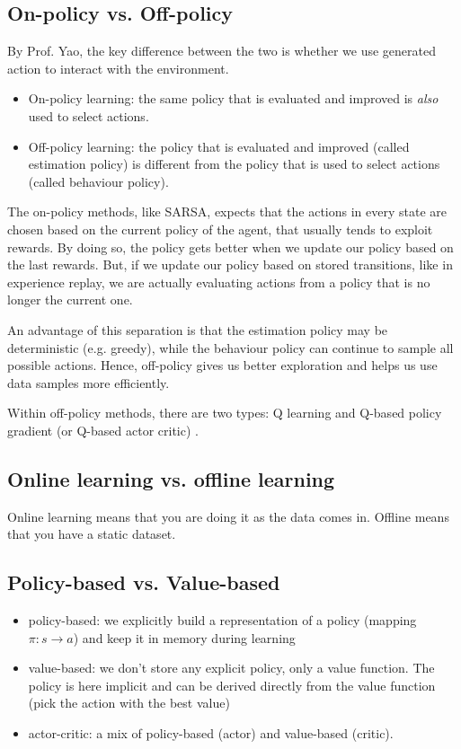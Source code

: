 \documentclass[lang=en,mode=normal,device=normal,color=blue,12pt]{elegantnote}
\DeclareMathOperator*{\1}{\mathbbm{1}}
\begin{document}
\subsection{On-policy vs. Off-policy}
\label{appendix:on-off-policy}

By Prof. Yao, the key difference between the two is whether we use generated action to interact with the environment.

\begin{itemize}
\item On-policy learning: the same policy that is evaluated and improved is \textit{also} used to select actions.
\item Off-policy learning: the policy that is evaluated and improved (called estimation policy) is different from the policy that is used to select actions (called behaviour policy).
\end{itemize}

The on-policy methods, like SARSA, expects that the actions in every state are chosen based on the current policy of the agent, that usually tends to exploit rewards. By doing so, the policy gets better when we update our policy based on the last rewards. But, if we update our policy based on stored transitions, like in experience replay, we are actually evaluating actions from a policy that is no longer the current one.

An advantage of this separation is that the estimation policy may be deterministic (e.g. greedy), while the behaviour policy can continue to sample all possible actions.
Hence, off-policy gives us better exploration and helps us use data samples more efficiently.

Within off-policy methods, there are two types: Q learning and Q-based policy gradient (or Q-based actor critic) \cite{ytbcs287}.

\subsection{Online learning vs. offline learning}
Online learning means that you are doing it as the data comes in. Offline means that you have a static dataset.

\subsection{Policy-based vs. Value-based}

\begin{itemize}
\item policy-based: we explicitly build a representation of a policy (mapping $\pi:s\rightarrow a$) and keep it in memory during learning
\item value-based: we don't store any explicit policy, only a value function. The policy is here implicit and can be derived directly from the value function (pick the action with the best value)
\item actor-critic: a mix of policy-based (actor) and value-based (critic).
\end{itemize}
\end{document}
